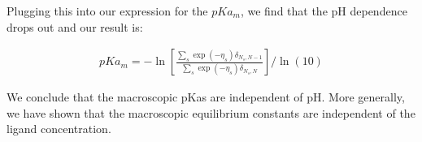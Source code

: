Plugging this into our expression for the $pKa_m$, we find that the pH
dependence drops out and our result is:

\begin{align*}
  pKa_m = -\ln \left[ \frac{\sum_s \exp(-\eta_s) \delta_{N_s,N-1}}{\sum_s \exp(- \eta_s) \delta_{N_s,N}} \right] / \ln(10)
\end{align*}

We conclude that the macroscopic pKas are independent of pH. More
generally, we have shown that the macroscopic equilibrium constants
are independent of the ligand concentration.
